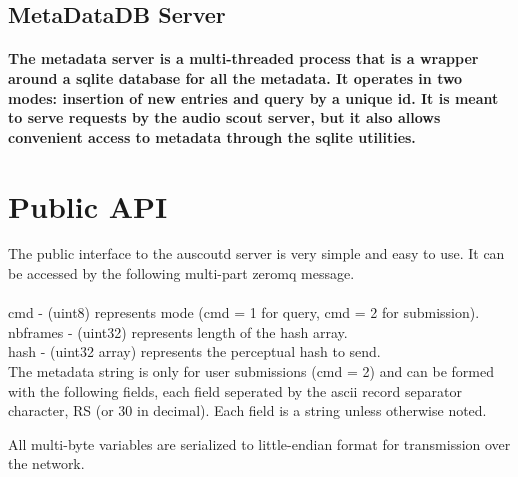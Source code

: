 \documentclass[11pt, a4paper]{article}
\begin{document}
\subsection{MetaDataDB Server}
\paragraph{The metadata server is a multi-threaded process that is a wrapper around a sqlite database for 
all the metadata. It operates in two modes: insertion of new entries and query 
by a unique id. It is meant to serve requests by the audio scout server, but it also 
allows convenient access to metadata through the sqlite utilities.}
\newpage
\section{Public API}
The public interface to the auscoutd server is very simple and easy to use.  
It can be accessed by the following multi-part zeromq message.\\
\vspace{5mm}
\\
\vspace{5mm}
cmd - (uint8) represents mode (cmd = 1 for query, cmd = 2 for submission).\\
nbframes - (uint32) represents length of the hash array.\\
hash - (uint32 array) represents the perceptual hash to send.\\
\vspace{5mm}
The metadata string is only for user submissions (cmd = 2) and can be formed with 
the following fields,  each field seperated by the ascii record separator character, RS 
(or 30 in decimal). Each 
field is a string unless otherwise noted.\\
\vspace{5mm}
\vspace{5mm}

All multi-byte variables are serialized to little-endian format for transmission over the
network.
\end{document}

